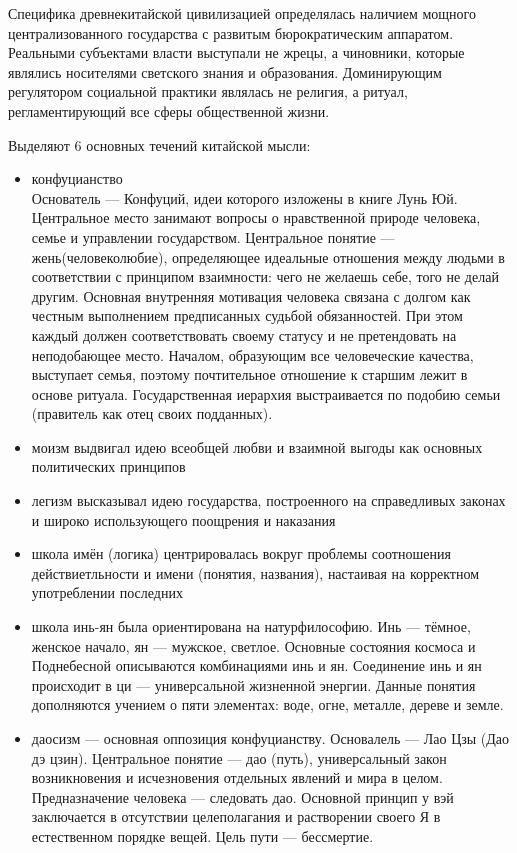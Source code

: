 Специфика древнекитайской цивилизацией определялась наличием мощного централизованного государства с развитым бюрократическим аппаратом. Реальными субъектами власти выступали не жрецы, а чиновники, которые являлись носителями светского знания и образования. Доминирующим регулятором социальной практики являлась не религия, а ритуал, регламентирующий все сферы общественной жизни.

Выделяют 6 основных течений китайской мысли:
\begin{itemize}
    \item конфуцианство\\
    Основатель --- Конфуций, идеи которого изложены в книге Лунь Юй. Центральное место занимают вопросы о нравственной природе человека, семье и управлении государством. Центральное понятие --- жень(человеколюбие), определяющее идеальные отношения между людьми в соответствии с принципом взаимности: чего не желаешь себе, того не делай другим. Основная внутренняя мотивация человека связана с долгом как честным выполнением предписанных судьбой обязанностей. При этом каждый должен соответствовать своему статусу и не претендовать на неподобающее место. Началом, образующим все человеческие качества, выступает семья, поэтому почтительное отношение к старшим лежит в основе ритуала. Государственная иерархия выстраивается по подобию семьи (правитель как отец своих подданных).
    \item моизм выдвигал идею всеобщей любви и взаимной выгоды как основных политических принципов
    \item легизм высказывал идею государства, построенного на справедливых законах и широко использующего поощрения и наказания
    \item школа имён (логика) центрировалась вокруг проблемы соотношения действиетльности и имени (понятия, названия), настаивая на корректном употреблении последних
    \item школа инь-ян была ориентирована на натурфилософию. Инь --- тёмное, женское начало, ян --- мужское, светлое. Основные состояния космоса и Поднебесной описываются комбинациями инь и ян. Соединение инь и ян происходит в ци --- универсальной жизненной энергии. Данные понятия дополняются учением о пяти элементах: воде, огне, металле, дереве и земле.
    \item даосизм --- основная оппозиция конфуцианству. Основалель --- Лао Цзы (Дао дэ цзин). Центральное понятие --- дао (путь), универсальный закон возникновения и исчезновения отдельных явлений и мира в целом. Предназначение человека --- следовать дао. Основной принцип у вэй заключается в отсутствии целеполагания и растворении своего Я в естественном порядке вещей. Цель пути --- бессмертие.
\end{itemize}

